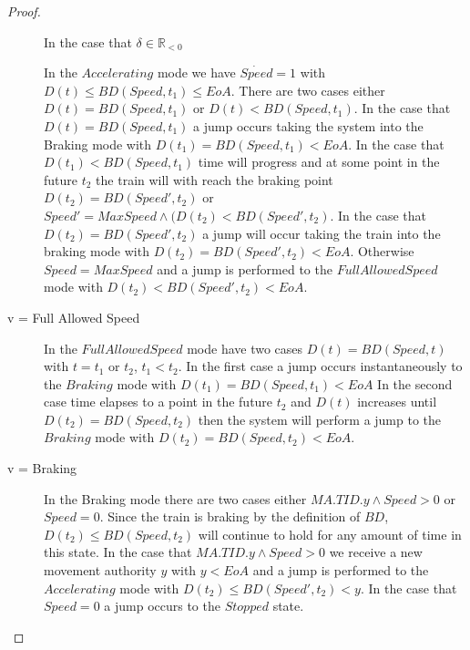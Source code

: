 \begin{mytheorem}
\begin{proof}
\begin{description}
In the case that $\delta \in \mathbb{R}_{< 0}$



 In the $Accelerating$ mode we have $\dot{Speed} = 1$ with $D(t) \leq BD(Speed, t_1) \leq  EoA$. There are two cases either $D(t) = BD(Speed,t_1)$ or $D(t) < BD(Speed, t_1)$.  In the case that $D(t) = BD(Speed,t_1)$  a jump occurs taking the system into the Braking mode
with $D(t_1) = BD(Speed,t_1) < EoA$. In the case that $D(t_1) < BD(Speed,t_1)$ time will progress and at some point in the future $t_2$ the train will with reach the braking point $D(t_2) = BD(Speed',t_2)$ or $Speed' = Max Speed \wedge (D(t_2) < BD(Speed', t_2)$.   In the case that $D(t_2) = BD(Speed', t_2)$ a jump will occur taking the train into the braking mode with $D(t_2) = BD(Speed',t_2) < EoA$. Otherwise $Speed = MaxSpeed$ and a jump is performed to the $Full Allowed Speed$ mode with $D(t_2) < BD(Speed', t_2) < EoA$.

\item[v = Full Allowed Speed] In the $Full Allowed Speed$ mode have  two cases  $D(t) = BD(Speed, t)$ with $t = t_1$ or $t_2$,  $t_1 < t_2$. In the first case a jump occurs instantaneously to the $Braking$ mode with $D(t_1) = BD(Speed, t_1) < EoA$ In the second case time elapses to a point in the future $t_2$ and $D(t)$ increases until $D(t_2) = BD(Speed, t_2)$  then the system will perform a jump to the $Braking$ mode with $D(t_2) = BD(Speed, t_2)  < EoA$. 

\item[v = Braking] In the Braking mode there are two cases either $MA.TID.y \wedge Speed > 0$ or $Speed = 0$. Since the train is braking by the definition of $BD$,  $D(t_2) \leq BD(Speed,t_2)$ will continue to hold for any amount of time in this state.  In the case that $MA.TID.y \wedge Speed > 0$ we receive a new movement authority $y$ with $y < EoA$ and a jump is performed to the $Accelerating$ mode with $D(t_2) \leq BD(Speed', t_2) < y$. In the case that $Speed = 0$ a jump occurs to the $Stopped$ state.
\end{description}

\end{proof}

\end{mytheorem}


